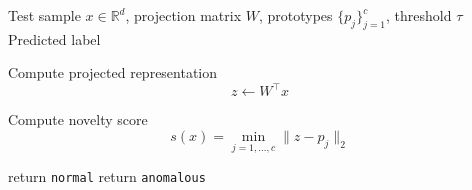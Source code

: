 \documentclass[final,twocolumn,10pt]{elsarticle}
\begin{document}
\begin{algorithm}[!htbp]
\caption{Inference Procedure of \textbf{XXX}}
\label{alg:test_locnfst}
\begin{algorithmic}
\REQUIRE Test sample \(x\in\mathbb{R}^d\), projection matrix \(W\), prototypes \(\{p_j\}_{j=1}^{c}\), threshold \(\tau\)
\ENSURE Predicted label

\STATE Compute projected representation
\[
z \gets W^\top x
\]

\STATE Compute novelty score
\[
s(x)=\min_{j=1,\ldots,c}\|z-p_j\|_2
\]

\STATE return \texttt{normal}
\ELSE
\STATE return \texttt{anomalous}
\ENDIF

\end{algorithmic}
\end{algorithm}




\end{document}
